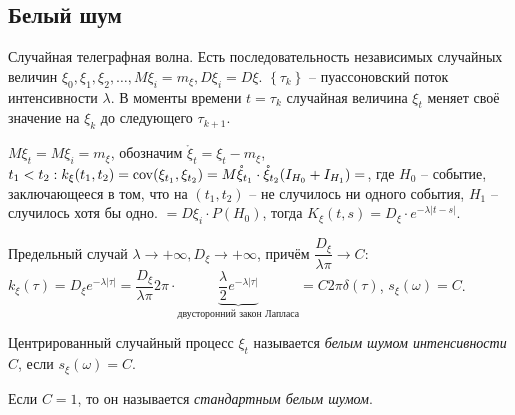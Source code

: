 \subsection{Белый шум}

\begin{ex}
  Случайная телеграфная волна. Есть последовательность независимых случайных величин
  $\xi_0, \xi_1, \xi_2, \dots, M\xi_i = m_\xi, D\xi_i = D\xi$.
  $ \left\{ \tau_k \right\}  $ -- пуассоновский поток интенсивности $\lambda$.
  В моменты времени $t = \tau_k$ случайная величина $\xi_t$ меняет своё значение на $\xi_k$ до следующего $\tau_{k+1}$.

  $M\xi_t = M\xi_i = m_\xi$, обозначим $\mathring{\xi}_t = \xi_t - m_\xi$,
  $t_1 < t_2 : k_\xi(t_1, t_2) = \operatorname{cov} (\xi_{t_1}, \xi_{t_2})
  = M \mathring{\xi}_{t_1} \cdot \mathring{\xi}_{t_2} (I_{H_0} + I_{H_1}) = $,
  где $H_0$ -- событие,
  заключающееся в том, что на $(t_1, t_2)$ -- не случилось ни одного события, $H_1$ -- случилось 
  хотя бы одно.
  $ = D\xi_i \cdot P(H_0)$,
  тогда $K_\xi(t, s) = D_\xi \cdot e^{-\lambda |t-s|}$.

  Предельный случай $\lambda \to +\infty, D_\xi \to +\infty$, причём
  $\dfrac{D_\xi}{\lambda \pi} \to C$: 
  $k_\xi(\tau) = D_\xi e^{-\lambda |\tau|} = \dfrac{D_\xi}{\lambda \pi} 2\pi \cdot \underbrace{\dfrac{\lambda}{2} e^{-\lambda|\tau|}}_{\text{двусторонний закон Лапласа}} = C 2\pi \delta(\tau)$,
  $s_\xi(\omega) = C$.
\end{ex}

\begin{definition}
  Центрированный случайный процесс $\xi_t$ называется \emph{белым шумом интенсивности $C$}, если
  $s_\xi(\omega) = C$. 

  Если $C = 1$, то он называется \emph{стандартным белым шумом}.
\end{definition}

